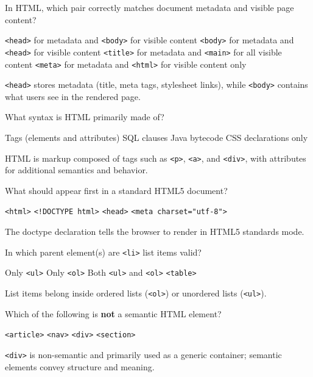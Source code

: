 \question[4]
In HTML, which pair correctly matches document metadata and visible page content?
\begin{choices}
  \CorrectChoice \texttt{<head>} for metadata and \texttt{<body>} for visible content
  \choice \texttt{<body>} for metadata and \texttt{<head>} for visible content
  \choice \texttt{<title>} for metadata and \texttt{<main>} for all visible content
  \choice \texttt{<meta>} for metadata and \texttt{<html>} for visible content only
\end{choices}
\begin{solution}
  \texttt{<head>} stores metadata (title, meta tags, stylesheet links), while \texttt{<body>} contains what users see in the rendered page.
\end{solution}

\question[4]
What syntax is HTML primarily made of?
\begin{choices}
  \CorrectChoice Tags (elements and attributes)
  \choice SQL clauses
  \choice Java bytecode
  \choice CSS declarations only
\end{choices}
\begin{solution}
  HTML is markup composed of tags such as \texttt{<p>}, \texttt{<a>}, and \texttt{<div>}, with attributes for additional semantics and behavior.
\end{solution}

\question[4]
What should appear first in a standard HTML5 document?
\begin{choices}
  \choice \texttt{<html>}
  \CorrectChoice \texttt{<!DOCTYPE html>}
  \choice \texttt{<head>}
  \choice \texttt{<meta charset="utf-8">}
\end{choices}
\begin{solution}
  The doctype declaration tells the browser to render in HTML5 standards mode.
\end{solution}

\question[4]
In which parent element(s) are \texttt{<li>} list items valid?
\begin{choices}
  \choice Only \texttt{<ul>}
  \choice Only \texttt{<ol>}
  \CorrectChoice Both \texttt{<ul>} and \texttt{<ol>}
  \choice \texttt{<table>}
\end{choices}
\begin{solution}
  List items belong inside ordered lists (\texttt{<ol>}) or unordered lists (\texttt{<ul>}).
\end{solution}

\question[4]
Which of the following is \textbf{not} a semantic HTML element?
\begin{choices}
  \choice \texttt{<article>}
  \choice \texttt{<nav>}
  \CorrectChoice \texttt{<div>}
  \choice \texttt{<section>}
\end{choices}
\begin{solution}
  \texttt{<div>} is non-semantic and primarily used as a generic container; semantic elements convey structure and meaning.
\end{solution}

